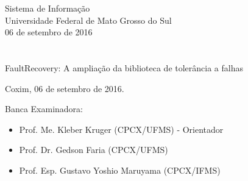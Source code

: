 \vskip 0.5cm
\begin{center}
Sistema de Informação\\
Universidade Federal de Mato Grosso do Sul\\
06 de setembro de 2016
\end{center}
		

\chapter*{}

\begin{center}

\begin{minipage}[t]{10cm}
	\begin{center}
		\vspace{-2cm}
		{{\Large FaultRecovery: A ampliação da biblioteca de tolerância a falhas}}  
	\end{center}
\end{minipage}

\end{center}


\begin{flushright}
	\vspace{12cm}
	Coxim, 06 de setembro de 2016.
	
\end{flushright}

\vspace{2cm}
Banca Examinadora:

\begin{itemize}
	\item Prof. Me. Kleber Kruger (CPCX/UFMS) - Orientador
	\item Prof. Dr. Gedson Faria (CPCX/UFMS)
	\item Prof. Esp. Gustavo Yoshio Maruyama (CPCX/IFMS)
\end{itemize}
